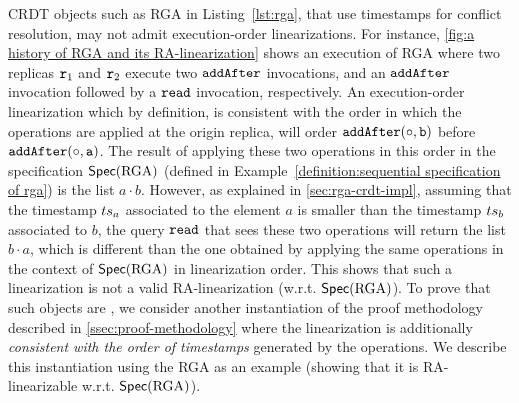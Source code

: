 CRDT objects such as RGA in Listing~\ref{lst:rga}, that use timestamps for conflict resolution, may not admit execution-order linearizations. 
For instance, \autoref{fig:a history of RGA and its RA-linearization} shows an execution of RGA where two replicas $\mathtt{r}_1$ and $\mathtt{r}_2$ execute two ${\tt addAfter}$ invocations, and an ${\tt addAfter}$ invocation followed by a ${\tt read}$ invocation, respectively. An execution-order linearization which by definition, is consistent with the order in which the operations are applied at the origin replica, will order $\alabelshort[{\tt addAfter}]{\circ,b}$ before $\alabelshort[{\tt addAfter}]{\circ,a}$. The result of applying these two operations in this order in the specification $\mathsf{Spec}(\text{RGA})$ (defined in Example~\ref{definition:sequential specification of rga}) is the list $a\cdot b$. However, as explained in \autoref{sec:rga-crdt-impl}, assuming that the timestamp $ts_a$ associated to the element $a$ is smaller than the timestamp $ts_b$ associated to $b$, the query ${\tt read}$ that sees these two operations will return the list $b\cdot a$, which is different than the one obtained by applying the same operations in the context of $\mathsf{Spec}(\text{RGA})$ in linearization order. This shows that such a linearization is not a valid RA-linearization (w.r.t. $\mathsf{Spec}(\text{RGA})$).
To prove that such objects are \crdtlinearizable{}, we consider another instantiation of the proof methodology described in \autoref{ssec:proof-methodology} where the linearization is additionally \emph{consistent with the order of timestamps} generated by the operations.
We describe this instantiation using the RGA as an example (showing that it is RA-linearizable w.r.t. $\mathsf{Spec}(\text{RGA})$).

